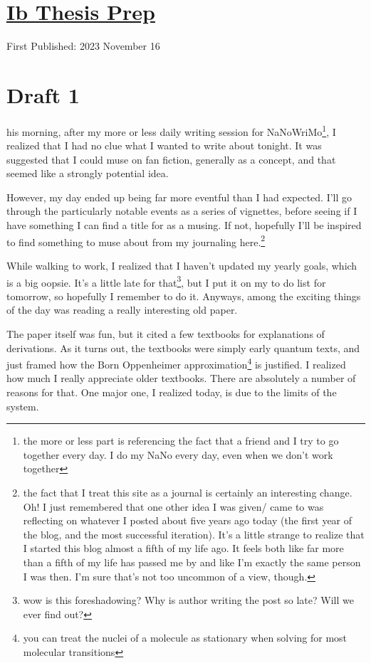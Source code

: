 \documentclass[12pt]{article}[titlepage]
\newcommand{\1}{\={a}}
\newcommand{\2}{\={e}}
\newcommand{\3}{\={\i}}
\newcommand{\4}{\=o}
\newcommand{\5}{\=u}
\newcommand{\6}{\={A}}
\renewcommand{\,}{\textsuperscript{,}}
\begin{document}
\doublespacing
\section{\href{thesis-prep.html}{Ib Thesis Prep}}
First Published: 2023 November 16

\section{Draft 1}
his morning, after my more or less daily writing session for NaNoWriMo\footnote{the more or less part is referencing the fact that a friend and I try to go together every day.
I do my NaNo every day, even when we don't work together}, I realized that I had no clue what I wanted to write about tonight.
It was suggested that I could muse on fan fiction, generally as a concept, and that seemed like a strongly potential idea.

However, my day ended up being far more eventful than I had expected.
I'll go through the particularly notable events as a series of vignettes, before seeing if I have something I can find a title for as a musing.
If not, hopefully I'll be inspired to find something to muse about from my journaling here.\footnote{the fact that I treat this site as a journal is certainly an interesting change.
Oh! I just remembered that one other idea I was given/ came to was reflecting on whatever I posted about five years ago today (the first year of the blog, and the most successful iteration).
It's a little strange to realize that I started this blog almost a fifth of my life ago.
It feels both like far more than a fifth of my life has passed me by and like I'm exactly the same person I was then.
I'm sure that's not too uncommon of a view, though.}

While walking to work, I realized that I haven't updated my yearly goals, which is a big oopsie.
It's a little late for that\footnote{wow is this foreshadowing? 
Why is author writing the post so late?
Will we ever find out?}, but I put it on my to do list for tomorrow, so hopefully I remember to do it.
Anyways, among the exciting things of the day was reading a really interesting old paper.

The paper itself was fun, but it cited a few textbooks for explanations of derivations.
As it turns out, the textbooks were simply early quantum texts, and just framed how the Born Oppenheimer approximation\footnote{you can treat the nuclei of a molecule as stationary when solving for most molecular transitions} is justified.
I realized how much I really appreciate older textbooks.
There are absolutely a number of reasons for that.
One major one, I realized today, is due to the limits of the system.
\end{document}
